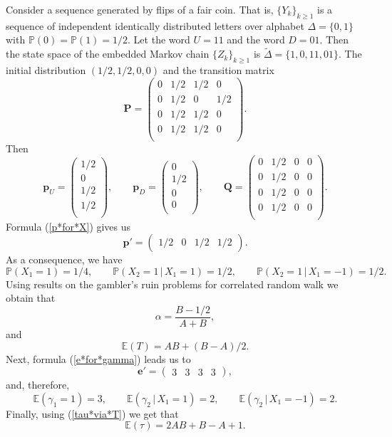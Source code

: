 \documentclass{amsart}
\newcommand{\PP}{{\mathbb{P}}}
\newcommand{\EE}{{\mathbb{E}}}
\newcommand{\1}{{\mathbf{1}}}
\newcommand{\gv}{\,|\,}
\begin{document}
Consider a sequence generated by flips of a fair coin. That is, $\{Y_k\}_{k\geq 1}$ is a
sequence of independent identically distributed letters over alphabet $\Delta=\{0,1\}$
with $\PP(0)=\PP(1)=1/2$. Let the word $U=11$ and the word $D=01$. Then the state space of
the embedded  Markov chain  $\{Z_k\}_{k\geq 1}$ is $\tilde{\Delta}=\{1,0,11,01\}$. The
initial distribution $(1/2,1/2,0,0)$ and the transition matrix
$$
\mathbf{P}=\begin{pmatrix}
               0 & 1/2 & 1/2 & 0 \\
               0 & 1/2 & 0 & 1/2 \\
               0 & 1/2 & 1/2 & 0 \\
               0 & 1/2 & 1/2 & 0 \\
             \end{pmatrix}.
$$
Then
$$
\mathbf{p}_U=\begin{pmatrix}
               1/2  \\
               0  \\
               1/2  \\
               1/2  \\
             \end{pmatrix},\quad\quad
\mathbf{p}_D=\begin{pmatrix}
               0  \\
               1/2  \\
               0  \\
               0  \\
             \end{pmatrix},\quad\quad
\mathbf{Q}=\begin{pmatrix}
               0 & 1/2 & 0 & 0 \\
               0 & 1/2 & 0 & 0 \\
               0 & 1/2 & 0 & 0 \\
               0 & 1/2 & 0 & 0 \\
             \end{pmatrix}.
$$
Formula (\ref{p*for*X}) gives us
$$
\mathbf{p}'=\begin{pmatrix}
               1/2  &
               0    &
               1/2  &
               1/2
             \end{pmatrix}.
$$
As a consequence, we have
$$\PP(X_1=1)=1/4,\quad\quad\PP(X_2=1\gv X_1=1)=1/2,\quad\quad \PP(X_2=1\gv X_1=-1)=1/2.$$
Using results on the gambler's ruin problems for correlated random walk we obtain that
$$\alpha=\frac{B-1/2}{A+B},$$
and
$$\EE(T)=AB+(B-A)/2.$$
Next, formula (\ref{e*for*gamma}) leads us to
$$
\mathbf{e}'=\begin{pmatrix}
               3 &
               3 &
               3 &
               3
             \end{pmatrix},
$$
and, therefore,
$$\EE(\gamma_1=1)=3,\quad\quad\EE(\gamma_2\gv X_1=1)=2,\quad\quad \EE(\gamma_2\gv X_1=-1)=2.$$
Finally, using (\ref{tau*via*T}) we get that
$$\EE(\tau)=2AB+B-A+1.$$
\end{document}
